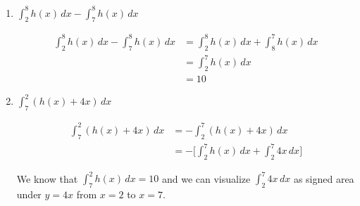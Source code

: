 \documentclass{article}
\begin{document}
\begin{enumerate}
    \begin{enumerate}[resume]

    
    \item 
    \begin{problem}
    $\displaystyle\int_{2}^{8} h(x) \,dx- \int_{7}^{8}h(x) \,dx$ 
    \end{problem}
    \pspace{\vfill}

    \begin{solution}
        \begin{align*}
            \displaystyle\int_{2}^{8} h(x) \,dx- \int_{7}^{8}h(x) \,dx &= \displaystyle\int_{2}^{8} h(x) \,dx+ \int_{8}^{7}h(x) \,dx\\
            &= \displaystyle\int_{2}^{7} h(x) \,dx\\
            &= \boxed{10}
        \end{align*}
    \end{solution}

    
    \item
    \begin{problem}
    $\displaystyle\int_{7}^{2} (h(x) + 4x)\,dx$
    \end{problem}
    \pspace{\vfill}
    
    \begin{solution}
        \begin{align*}
            \displaystyle\int_{7}^{2} (h(x) + 4x)\,dx &= -\displaystyle\int_{2}^{7} (h(x) + 4x)\,dx\\
            &= -\Bigg[\displaystyle\int_{2}^{7} h(x)\,dx + \displaystyle\int_{2}^{7} 4x \,dx \Bigg]
        \end{align*}

    We know that $\displaystyle\int_{7}^{2} h(x) \, dx=10$ and we can visualize $\displaystyle\int_{2}^{7} 4x \,dx$ as signed area under $y=4x$ from $x=2$ to $x=7$.

    \begin{center}
    \end{center}


\end{solution}
\end{enumerate}
\end{enumerate}
\end{document}
